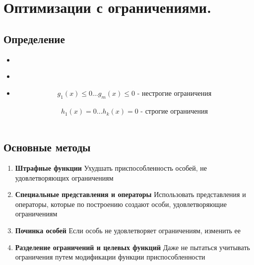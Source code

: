 \section{Оптимизации с ограничениями.}

\subsection{Определение}
\begin{itemize}
    \item {} \\
    \item {} \\
    \item {}
    \subitem \[g_{1}(x) \leq 0 \dots g_{m}(x) \leq 0 \text{ -  нестрогие ограничения} \] \\
    \subitem \[h_{1}(x) = 0 \dots h_{k}(x) = 0 \text{ - строгие ограничения} \] \\
\end{itemize}

\subsection{Основные методы}

\begin{enumerate}
    \item \textbf{Штрафные функции}
    \subitem Ухудшать приспособленность особей, не удовлетворяющих ограничениям
    \item \textbf{Специальные представления и операторы}
    \subitem  Использовать представления и операторы, которые по построению создают особи, удовлетворяющие ограничениям
    \item \textbf{Починка особей}
    \subitem  Если особь не удовлетворяет ограничениям, изменить ее
    \item \textbf{Разделение ограничений и целевых функций}
    \subitem Даже не пытаться учитывать ограничения путем модификации функции приспособленности
\end{enumerate}



